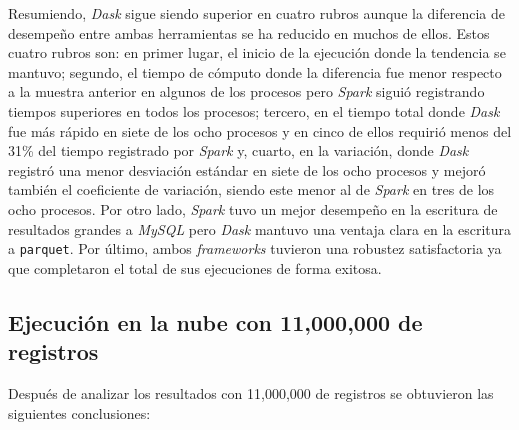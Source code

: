 Resumiendo, \textit{Dask} sigue siendo superior en cuatro rubros aunque la diferencia de desempeño entre ambas herramientas se ha reducido en muchos de ellos. Estos cuatro rubros son: en primer lugar, el inicio de la ejecución donde la tendencia se mantuvo; segundo, el tiempo de cómputo donde la diferencia fue menor respecto a la muestra anterior en algunos de los procesos pero \textit{Spark} siguió registrando tiempos superiores en todos los procesos; tercero, en el tiempo total donde \textit{Dask} fue más rápido en siete de los ocho procesos y en cinco de ellos requirió menos del 31\% del tiempo registrado por \textit{Spark} y, cuarto, en la variación, donde \textit{Dask} registró una menor desviación estándar en siete de los ocho procesos y mejoró también el coeficiente de variación, siendo este menor al de \textit{Spark} en tres de los ocho procesos. Por otro lado, \textit{Spark} tuvo un mejor desempeño en la escritura de resultados grandes a \textit{MySQL} pero \textit{Dask} mantuvo una ventaja clara en la escritura a \texttt{parquet}. Por último, ambos \textit{frameworks} tuvieron una robustez satisfactoria ya que completaron el total de sus ejecuciones de forma exitosa.


\subsection{Ejecución en la nube con 11,000,000 de registros}

Después de analizar los resultados con 11,000,000 de registros se obtuvieron las siguientes conclusiones:

